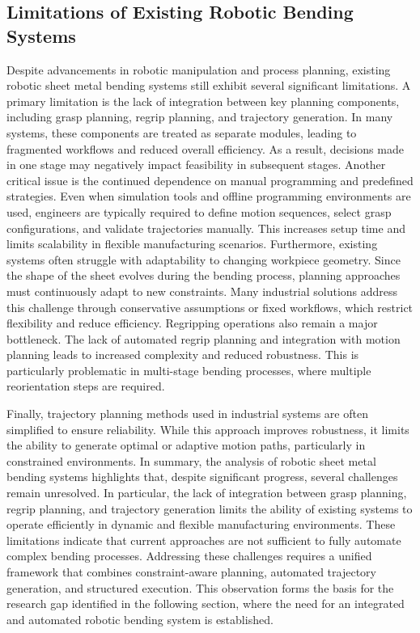 \subsection{Limitations of Existing Robotic Bending Systems}
Despite advancements in robotic manipulation and process planning, existing robotic sheet metal bending systems still exhibit several significant limitations.
A primary limitation is the lack of integration between key planning components, including grasp planning, regrip planning, and trajectory generation. In many systems, these components are treated as separate modules, leading to fragmented workflows and reduced overall efficiency. As a result, decisions made in one stage may negatively impact feasibility in subsequent stages.
Another critical issue is the continued dependence on manual programming and predefined strategies. Even when simulation tools and offline programming environments are used, engineers are typically required to define motion sequences, select grasp configurations, and validate trajectories manually. This increases setup time and limits scalability in flexible manufacturing scenarios.
Furthermore, existing systems often struggle with adaptability to changing workpiece geometry. Since the shape of the sheet evolves during the bending process, planning approaches must continuously adapt to new constraints. Many industrial solutions address this challenge through conservative assumptions or fixed workflows, which restrict flexibility and reduce efficiency.
Regripping operations also remain a major bottleneck. The lack of automated regrip planning and integration with motion planning leads to increased complexity and reduced robustness. This is particularly problematic in multi-stage bending processes, where multiple reorientation steps are required.
 
Finally, trajectory planning methods used in industrial systems are often simplified to ensure reliability. While this approach improves robustness, it limits the ability to generate optimal or adaptive motion paths, particularly in constrained environments.
In summary, the analysis of robotic sheet metal bending systems highlights that, despite significant progress, several challenges remain unresolved. In particular, the lack of integration between grasp planning, regrip planning, and trajectory generation limits the ability of existing systems to operate efficiently in dynamic and flexible manufacturing environments.
These limitations indicate that current approaches are not sufficient to fully automate complex bending processes. Addressing these challenges requires a unified framework that combines constraint-aware planning, automated trajectory generation, and structured execution.
This observation forms the basis for the research gap identified in the following section, where the need for an integrated and automated robotic bending system is established.



